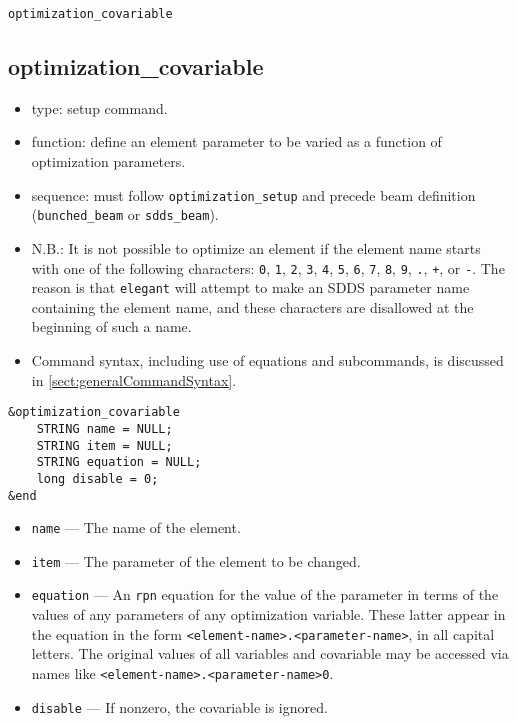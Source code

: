 \documentclass[11pt]{article}
\begin{document}
\newpage
\begin{center}{\Large\verb|optimization_covariable|}\end{center}
\subsection{optimization\_covariable \label{subsec:optimizationcovariable}}

\begin{itemize}
\item type: setup command.
\item function: define an element parameter to be varied as a function of optimization parameters.
\item sequence: must follow \verb|optimization_setup| and precede beam definition (\verb|bunched_beam| or \verb|sdds_beam|).
\item N.B.: It is not possible to optimize an element if the element name starts with one of the following
characters: 
\verb|0|, \verb|1|, \verb|2|, \verb|3|, \verb|4|, \verb|5|, \verb|6|, \verb|7|, \verb|8|,
\verb|9|, \verb|.|, \verb|+|, or \verb|-|.  The reason is that {\tt elegant} will attempt to 
make an SDDS parameter name containing the element name, and these characters are disallowed
at the beginning of such a name.
\item Command syntax, including use of equations and subcommands, is discussed in \ref{sect:generalCommandSyntax}.
\end{itemize}

\begin{verbatim}
&optimization_covariable
    STRING name = NULL;
    STRING item = NULL;
    STRING equation = NULL;
    long disable = 0;
&end
\end{verbatim}

\begin{itemize}
\item \verb|name| --- The name of the element.
\item \verb|item| --- The parameter of the element to be changed.
\item \verb|equation| --- An {\tt rpn} equation for the value of the parameter in terms of the
values of any parameters of any optimization variable.  These latter appear in the equation in the
form \verb|<element-name>.<parameter-name>|, in all capital letters.  The original values of all
variables and covariable may be accessed via names like \verb|<element-name>.<parameter-name>0|.
\item \verb|disable| --- If nonzero, the covariable is ignored.
\end{itemize}
\end{document}

